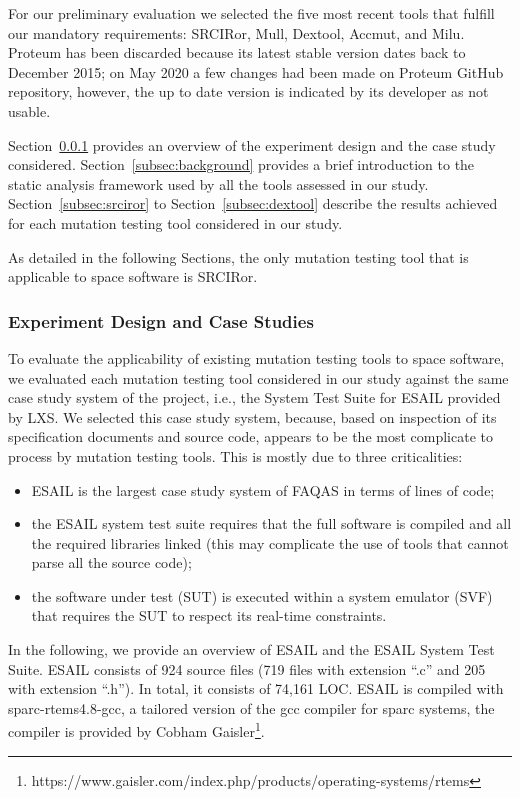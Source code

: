 For our preliminary evaluation we selected the five most recent tools that fulfill our mandatory requirements: SRCIRor, Mull, Dextool, Accmut, and Milu. Proteum has been discarded because its latest stable version dates back to December 2015; on May 2020 a few changes had been made on Proteum GitHub repository, however, the up to date version is indicated by its developer as not usable.

Section~\ref{subsec:experiment_design} provides an overview of the experiment design and the case study considered. 
Section~\ref{subsec:background} provides a brief introduction to the static analysis framework used by all the tools assessed in our study.
Section~\ref{subsec:srciror} to Section~\ref{subsec:dextool} describe the results achieved for each mutation testing tool considered in our study.

As detailed in the following Sections, the only mutation testing tool that is applicable to space software is SRCIRor.

\subsubsection{Experiment Design and Case Studies}
\label{subsec:experiment_design}




To evaluate the applicability of existing mutation testing tools to space software, we evaluated each mutation testing tool considered in our study against the same case study system of the project, i.e., the System Test Suite for ESAIL provided by LXS. We selected this case study system, because, based on inspection of its specification documents and source code, appears to be the most complicate to process by mutation testing tools. This is mostly due to three criticalities:

\begin{itemize}
	\item ESAIL is the largest case study system of FAQAS in terms of lines of code;
	\item the ESAIL system test suite requires that the full software is compiled and all the required libraries linked (this may complicate the use of tools that cannot parse all the source code);
	\item the software under test (SUT) is executed within a system emulator (SVF) that requires the SUT to respect its real-time constraints.
\end{itemize}

In the following, we provide an overview of ESAIL and the ESAIL System Test Suite. ESAIL consists of 924 source files (719 files with extension ``.c'' and 205 with extension ``.h''). In total, it consists of 74,161 LOC. ESAIL is compiled with sparc-rtems4.8-gcc, a tailored version of the gcc compiler for sparc systems, the compiler is provided by Cobham Gaisler\footnote{https://www.gaisler.com/index.php/products/operating-systems/rtems}.


